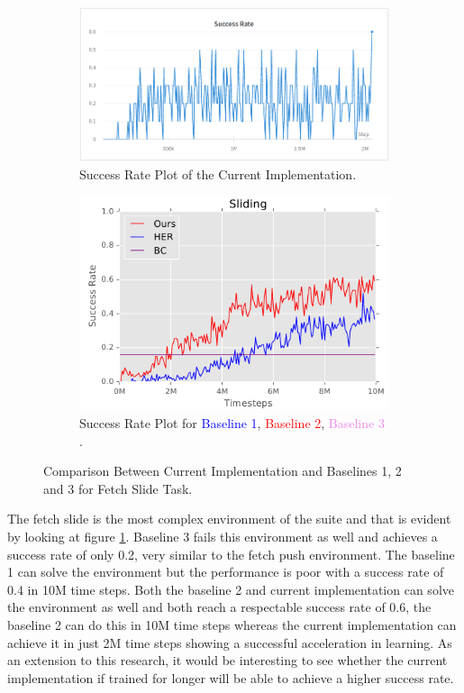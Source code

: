 \begin{figure}[h!]
     \centering
     \begin{subfigure}[b]{0.4\textwidth}
         \centering
         \includegraphics[width=\textwidth]{images/FSSR.png}
         \caption{Success Rate Plot of the Current Implementation.}
     \end{subfigure}
     \begin{subfigure}[b]{0.4\textwidth}
         \centering
         \includegraphics[width=\textwidth]{images/FSB.png}
         \caption{Success Rate Plot for \textcolor{blue}{Baseline 1}, \textcolor{red}{Baseline 2}, \textcolor{violet}{Baseline 3} \cite{nair2018overcoming}.}
     \end{subfigure}
        \caption{Comparison Between Current Implementation and Baselines 1, 2 and 3 for Fetch Slide Task.}
        \label{fig:FSR}
\end{figure}

The fetch slide is the most complex environment of the suite and that is evident by looking at figure \ref{fig:FSR}. Baseline 3 fails this environment as well and achieves a success rate of only 0.2, very similar to the fetch push environment. The baseline 1 can solve the environment but the performance is poor with a success rate of 0.4 in 10M time steps. Both the baseline 2 and current implementation can solve the environment as well and both reach a respectable success rate of 0.6, the baseline 2 can do this in 10M time steps whereas the current implementation can achieve it in just 2M time steps showing a successful acceleration in learning. As an extension to this research, it would be interesting to see whether the current implementation if trained for longer will be able to achieve a higher success rate. \\

